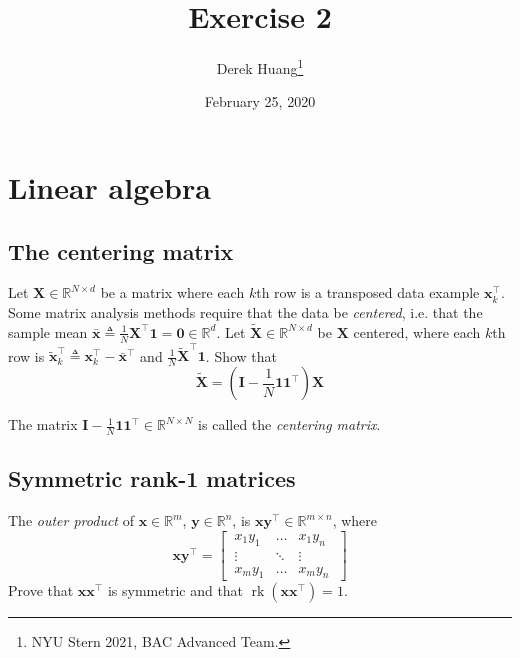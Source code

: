 \documentclass{article}
\title{Exercise 2}
\author{Derek Huang\thanks{NYU Stern 2021, BAC Advanced Team.}}
\date{February 25, 2020}
\numberwithin{equation}{section}
\begin{document}
\maketitle
\thispagestyle{fancy}

\section{Linear algebra}

\subsection{The centering matrix}

Let $ \mathbf{X} \in \mathbb{R}^{N \times d} $ be a matrix where each $ k $th
row is a transposed data example $ \mathbf{x}_k^\top $. Some matrix analysis
methods require that the data be \textit{centered}, i.e. that the sample mean
$ \bar{\mathbf{x}} \triangleq \frac{1}{N}\mathbf{X}^\top\mathbf{1} =
\mathbf{0} \in \mathbb{R}^d $. Let $ \tilde{\mathbf{X}} \in
\mathbb{R}^{N \times d} $ be $ \mathbf{X} $ centered, where each $ k $th row
is $ \tilde{\mathbf{x}}_k^\top \triangleq \mathbf{x}_k^\top -
\bar{\mathbf{x}}^\top $ and $ \frac{1}{N}\tilde{\mathbf{X}}^\top\mathbf{1} $.
Show that 
\begin{equation*}
    \tilde{\mathbf{X}} = \left(
        \mathbf{I} - \frac{1}{N}\mathbf{11}^\top
    \right)\mathbf{X}
\end{equation*}

The matrix $ \mathbf{I} - \frac{1}{N}\mathbf{11}^\top \in
\mathbb{R}^{N \times N} $ is called the \textit{centering matrix}.

\subsection{Symmetric rank-1 matrices}

The \textit{outer product} of $ \mathbf{x} \in \mathbb{R}^m $,
$ \mathbf{y} \in \mathbb{R}^n $, is $ \mathbf{xy}^\top \in
\mathbb{R}^{m \times n} $, where
\begin{equation*}
    \mathbf{xy}^\top = \begin{bmatrix}
        \ x_1y_1 & \ldots & x_1y_n \ \\
        \ \vdots & \ddots & \vdots \ \\
        \ x_my_1 & \ldots & x_my_n \
    \end{bmatrix}
\end{equation*}
Prove that $ \mathbf{xx}^\top $ is symmetric and that
$ \operatorname{rk}\left(\mathbf{xx}^\top\right) = 1 $.
\end{document}
